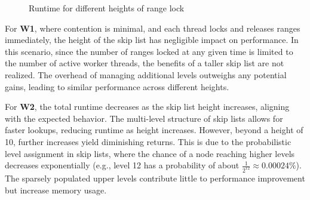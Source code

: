 \begin{figure}[h]
    \centering
    \caption{Runtime for different heights of range lock}
\end{figure}

For \textbf{W1}, where contention is minimal, and each thread locks and releases ranges immediately, the height of the skip list has negligible impact on performance. 
In this scenario, since the number of ranges locked at any given time is limited to the number of active worker threads, the benefits of a taller skip list are not realized. 
The overhead of managing additional levels outweighs any potential gains, leading to similar performance across different heights.

For \textbf{W2}, the total runtime decreases as the skip list height increases, aligning with the expected behavior. 
The multi-level structure of skip lists allows for faster lookups, reducing runtime as height increases. 
However, beyond a height of 10, further increases yield diminishing returns. 
This is due to the probabilistic level assignment in skip lists, where the chance of a node reaching higher levels decreases exponentially (e.g., level 12 has a probability of about \(\frac{1}{2^{12}} \approx 0.00024\%\)). 
The sparsely populated upper levels contribute little to performance improvement but increase memory usage.

